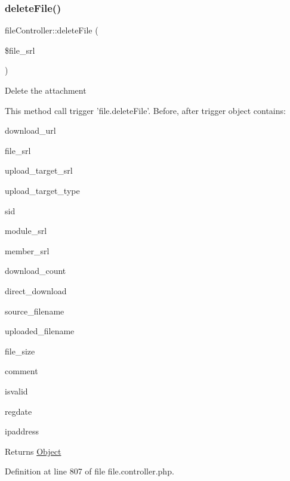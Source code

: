 \subsubsection{\texorpdfstring{delete\+File()}{deleteFile()}}
{\footnotesize\ttfamily file\+Controller\+::delete\+File (\begin{DoxyParamCaption}\item[{}]{\$file\+\_\+srl }\end{DoxyParamCaption})}

Delete the attachment


\begin{DoxyPre}
This method call trigger 'file.deleteFile'.
Before, after trigger object contains:
\begin{DoxyItemize}
\item download\_url
\item file\_srl
\item upload\_target\_srl
\item upload\_target\_type
\item sid
\item module\_srl
\item member\_srl
\item download\_count
\item direct\_download
\item source\_filename
\item uploaded\_filename
\item file\_size
\item comment
\item isvalid
\item regdate
\item ipaddress

\end{DoxyItemize}\end{DoxyPre}



\begin{DoxyPre}
\begin{DoxyReturn}{Returns}
\hyperlink{classObject}{Object}

\end{DoxyReturn}
\end{DoxyPre}


Definition at line 807 of file file.\+controller.\+php.

